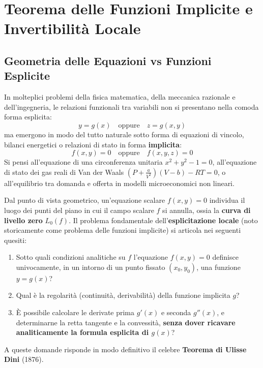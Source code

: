 
\chapter{Teorema delle Funzioni Implicite e Invertibilità Locale}
\label{chap:funzioni_implicite}

\section{Geometria delle Equazioni vs Funzioni Esplicite}

In molteplici problemi della fisica matematica, della meccanica razionale e dell'ingegneria, le relazioni funzionali tra variabili non si presentano nella comoda forma esplicita:
\[
y = g(x) \quad \text{oppure} \quad z = g(x, y)
\]
ma emergono in modo del tutto naturale sotto forma di equazioni di vincolo, bilanci energetici o relazioni di stato in forma \textbf{implicita}:
\[
f(x, y) = 0 \quad \text{oppure} \quad f(x, y, z) = 0
\]
Si pensi all'equazione di una circonferenza unitaria $x^2 + y^2 - 1 = 0$, all'equazione di stato dei gas reali di Van der Waals $\left( P + \frac{a}{V^2} \right)(V - b) - RT = 0$, o all'equilibrio tra domanda e offerta in modelli microeconomici non lineari.

Dal punto di vista geometrico, un'equazione scalare $f(x,y) = 0$ individua il luogo dei punti del piano in cui il campo scalare $f$ si annulla, ossia la \textbf{curva di livello zero} $L_0(f)$.
Il problema fondamentale dell'\textbf{esplicitazione locale} (noto storicamente come problema delle funzioni implicite) si articola nei seguenti quesiti:
\begin{enumerate}
    \item Sotto quali condizioni analitiche su $f$ l'equazione $f(x,y) = 0$ definisce univocamente, in un intorno di un punto fissato $(x_0, y_0)$, una funzione $y = g(x)$?
    \item Qual è la regolarità (continuità, derivabilità) della funzione implicita $g$?
    \item È possibile calcolare le derivate prima $g'(x)$ e seconda $g''(x)$, e determinarne la retta tangente e la convessità, \textbf{senza dover ricavare analiticamente la formula esplicita di $g(x)$}?
\end{enumerate}
A queste domande risponde in modo definitivo il celebre \textbf{Teorema di Ulisse Dini} (1876).

